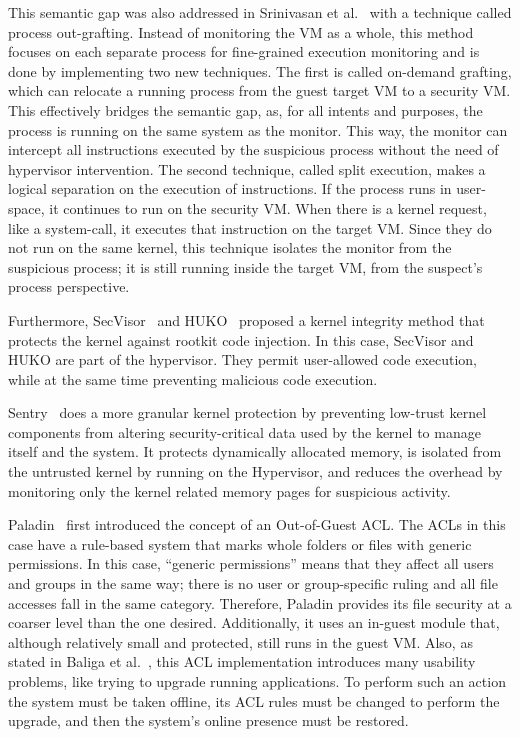 \par This semantic gap was also addressed in Srinivasan et al.~\cite{srinivasan2011process} with a technique called process out-grafting. Instead of monitoring the \ac{VM} as a whole, this method focuses on each separate process for fine-grained execution monitoring and is done by implementing two new techniques. The first is called on-demand grafting, which can relocate a running process from the guest target \ac{VM} to a security \ac{VM}. This effectively bridges the semantic gap, as, for all intents and purposes, the process is running on the same system as the monitor. This way, the monitor can intercept all instructions executed by the suspicious process without the need of hypervisor intervention. The second technique, called split execution, makes a logical separation on the execution of instructions. If the process runs in user-space, it continues to run on the security \ac{VM}. When there is a kernel request, like a system-call, it executes that instruction on the target \ac{VM}. Since they do not run on the same kernel, this technique isolates the monitor from the suspicious process; it is still running inside the target \ac{VM}, from the suspect’s process perspective. 

\par Furthermore, SecVisor~\cite{seshadri2007secvisor} and HUKO~\cite{xiong2011practical} proposed a kernel integrity method that protects the kernel against rootkit code injection. In this case, SecVisor and HUKO are part of the hypervisor. They permit user-allowed code execution, while at the same time preventing malicious code execution.


\par Sentry~\cite{srivastava2012efficient} does a more granular kernel protection by preventing low-trust kernel components from altering security-critical data used by the kernel to manage itself and the system. It protects dynamically allocated memory, is isolated from the untrusted kernel by running on the Hypervisor, and reduces the overhead by monitoring only the kernel related memory pages for suspicious activity.


\par Paladin~\cite{baliga2008automated} first introduced the concept of an Out-of-Guest \ac{ACL}. The \acp{ACL} in this case have a rule-based system that marks whole folders or files with generic permissions. In this case, ``generic permissions'' means that they affect all users and groups in the same way; there is no user or group-specific ruling and all file accesses fall in the same category. Therefore, Paladin provides its file security at a coarser level than the one desired. Additionally, it uses an in-guest module that, although relatively small and protected, still runs in the guest \ac{VM}. Also, as stated in Baliga et al.~\cite{baliga2008automated}, this \ac{ACL} implementation introduces many usability problems, like trying to upgrade running applications. To perform such an action the system must be taken offline, its \ac{ACL} rules must be changed to perform the upgrade, and then the system's online presence must be restored. 

